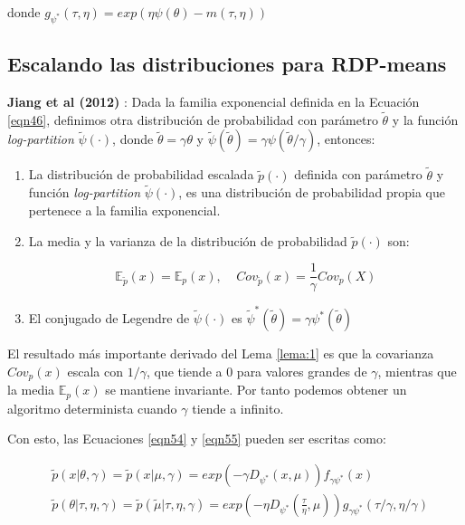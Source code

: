 donde $g_{\psi^*}(\tau, \eta) = exp(\eta \psi(\theta) - m(\tau, \eta))$

\subsection{Escalando las distribuciones para RDP-means}

\begin{lema}

	\textbf{Jiang et al (2012)} \cite{DPM:2012}: Dada la familia exponencial definida en la Ecuación \ref{eqn46}, definimos otra distribución de probabilidad con parámetro $\widetilde{\theta}$ y la función \textit{log-partition} $\widetilde{\psi}(\cdot)$, donde $\widetilde{\theta} = \gamma\theta$ y $\widetilde{\psi}(\widetilde{\theta}) = \gamma \psi (\widetilde{\theta}/\gamma)$, entonces:
	
	\begin{enumerate}
		
		\item La distribución de probabilidad escalada $\widetilde{p}(\cdot)$ definida con parámetro $\widetilde{\theta}$ y función \textit{log-partition} $\widetilde{\psi}(\cdot)$, es una distribución de probabilidad propia que pertenece a la familia exponencial.
		
		\item La media y la varianza de la distribución de probabilidad $\widetilde{p}(\cdot)$ son:
		
		$$ \mathbb{E}_{\widetilde{p}}(x) = \mathbb{E}_{p}(x), \;\;\;\; Cov_{\widetilde{p}}(x) = \frac{1}{\gamma}Cov_p(X) $$
		
		\item El conjugado de Legendre de $\widetilde{\psi}(\cdot)$ es $\widetilde{\psi}^*(\widetilde{\theta}) = \gamma \psi^*(\widetilde{\theta}) $
		
	\end{enumerate}
	\label{lema:1}
\end{lema}

El resultado más importante derivado del Lema \ref{lema:1} es que la covarianza $Cov_p(x)$ escala con $1/\gamma$, que tiende a $0$ para valores grandes de $\gamma$, mientras que la media $\mathbb{E}_{p}(x)$ se mantiene invariante. Por tanto podemos obtener un algoritmo determinista cuando $\gamma$ tiende a infinito.

Con esto, las Ecuaciones \ref{eqn54} y \ref{eqn55} pueden ser escritas como:

\begin{equation}
\begin{split}
&\widetilde{p}(x|\theta, \gamma) = \widetilde{p}(x|\mu, \gamma) = exp(-\gamma D_{\psi^*}(x,\mu)) f_{\gamma \psi^*}(x)\\
&\widetilde{p}(\theta|\tau,\eta,\gamma) = \widetilde{p}(\widetilde{\mu}|\tau,\eta,\gamma) = exp\left(-\eta D_{\psi^*}(\frac{\tau}{\eta}, \mu)\right)g_{\gamma \psi^*}(\tau / \gamma, \eta / \gamma)
\end{split}
\label{eqn56}
\end{equation}

